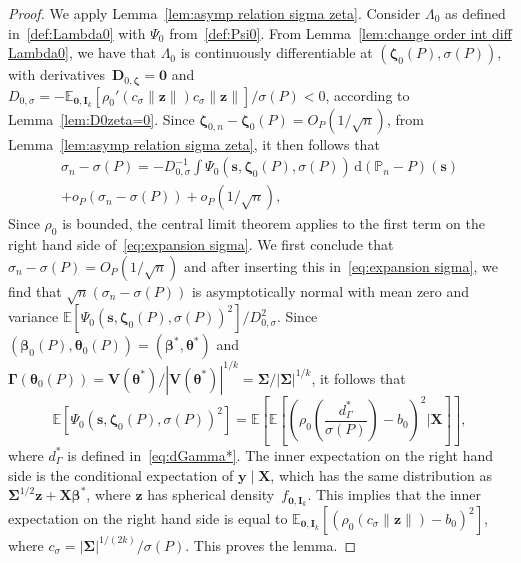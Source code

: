 \documentclass{article}
\numberwithin{equation}{section}
\theoremstyle{plain}
\newcommand{\dd}{\mathrm{d}}
\newcommand{\bbeta}{\bm\beta}
\newcommand{\btheta}{\bm\theta}
\newcommand{\bSigma}{\mathbf{\Sigma}}
\newcommand{\bGamma}{\bm\Gamma}
\newcommand{\bzeta}{\bm\zeta}
\newcommand{\by}{\mathbf{y}}
\newcommand{\bz}{\mathbf{z}}
\newcommand{\bX}{\mathbf{X}}
\newcommand{\bV}{\mathbf{V}}
\newcommand{\bI}{\mathbf{I}}
\newcommand{\bD}{\mathbf{D}}
\newcommand{\E}{\mathbb{E}}
\begin{document}
\begin{proof}
We apply Lemma~\ref{lem:asymp relation sigma zeta}.
Consider $\Lambda_0$ as defined in~\eqref{def:Lambda0} with $\Psi_0$ from~\eqref{def:Psi0}.
From Lemma~\ref{lem:change order int diff Lambda0}, we have that
$\Lambda_0$ is continuously differentiable at $(\bzeta_0(P),\sigma(P))$, 
with derivatives~$\bD_{0,\bzeta}=\mathbf{0}$ and
$D_{0,\sigma}=-\E_{\mathbf{0},\bI_k}[\rho_0'(c_\sigma\|\bz\|)c_\sigma\|\bz\|]/\sigma(P)<0$,
according to Lemma~\ref{lem:D0zeta=0}.
Since $\bzeta_{0,n}-\bzeta_0(P)=O_P(1/\sqrt{n})$,
from Lemma~\ref{lem:asymp relation sigma zeta}, it then follows that
\begin{equation}
\label{eq:expansion sigma}
\begin{split}
\sigma_n-\sigma(P)
=
-D_{0,\sigma}^{-1}
\int \Psi_0(\mathbf{s},\bzeta_0(P),\sigma(P))\,\dd (\mathbb{P}_n-P)(\mathbf{s})\\
+
o_P(\sigma_n-\sigma(P))
+
o_P(1/\sqrt{n}),
\end{split}
\end{equation}
Since $\rho_0$ is bounded, the central limit theorem applies 
to the first term on the right hand side of~\eqref{eq:expansion sigma}.
We first conclude that $\sigma_n-\sigma(P)=O_P(1/\sqrt{n})$ and
after inserting this in~\eqref{eq:expansion sigma},
we find that 
$\sqrt{n}(\sigma_n-\sigma(P))$ is asymptotically normal with mean zero and variance
$\E\left[\Psi_0(\mathbf{s},\bzeta_0(P),\sigma(P))^2\right]/D_{0,\sigma}^2$.
Since $(\bbeta_0(P),\btheta_0(P))=(\bbeta^*,\btheta^*)$ and 
$\bGamma(\btheta_0(P))=\bV(\btheta^*)/|\bV(\btheta^*)|^{1/k}=\bSigma/|\bSigma|^{1/k}$,
it follows that
\[
\E\left[
\Psi_0(\mathbf{s},\bzeta_0(P),\sigma(P))^2
\right]
=
\E
\left[
\E\left[
\left(
\rho_0
\left(
\frac{d_{\Gamma}^*}{\sigma(P)}\right)
-b_0
\right)^2
\bigg|
\bX
\right]
\right],
\]
where $d_{\Gamma}^*$ is defined in~\eqref{eq:dGamma*}.
The inner expectation on the right hand side
is the conditional expectation of $\by\mid\bX$,
which has the same distribution as 
$\bSigma^{1/2}\bz+\bX\bbeta^*$, where $\bz$ has spherical density~$f_{\mathbf{0},\bI_k}$.
This implies that the inner expectation on the right hand side is equal to
$\E_{\mathbf{0},\bI_k}
[(\rho_0(c_\sigma\|\bz\|)-b_0)^2]$,
where $c_\sigma=|\bSigma|^{1/(2k)}/\sigma(P)$.
This proves the lemma.
\end{proof}
\end{document}
